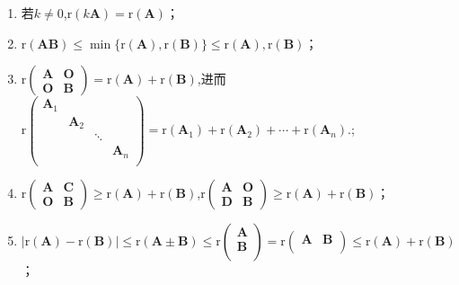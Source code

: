 \documentclass[../../main.tex]{subfiles}%
\begin{document}
\begin{proposition}[矩阵秩的基本公式]\label{proposition:矩阵秩的基本公式}
\begin{enumerate}[(1)]
\item \label{矩阵秩的基本公式1}若\(k\neq0\),\(\mathrm{r}(k\boldsymbol{A})=\mathrm{r}(\boldsymbol{A})\)；

\item \label{矩阵秩的基本公式2}\(\mathrm{r}(\boldsymbol{A}\boldsymbol{B})\leqslant \min\{\mathrm{r}(\boldsymbol{A}),\mathrm{r}(\boldsymbol{B})\}\leqslant \mathrm{r}(\boldsymbol{A}),\mathrm{r}(\boldsymbol{B})\)；

\item \label{矩阵秩的基本公式3}\(\mathrm{r}\begin{pmatrix}\boldsymbol{A}&\boldsymbol{O}\\\boldsymbol{O}&\boldsymbol{B}\end{pmatrix}=\mathrm{r}(\boldsymbol{A})+\mathrm{r}(\boldsymbol{B})\),进而$\mathrm{r}\left( \begin{matrix}
\boldsymbol{A}_1&		&		&		\\
&		\boldsymbol{A}_2&		&		\\
&		&		\ddots&		\\
&		&		&		\boldsymbol{A}_n\\
\end{matrix} \right) =\mathrm{r}\left( \boldsymbol{A}_1 \right) +\mathrm{r}\left( \boldsymbol{A}_2 \right) +\cdots +\mathrm{r}\left( \boldsymbol{A}_n \right) .$;

\item \label{矩阵秩的基本公式4}\(\mathrm{r}\begin{pmatrix}\boldsymbol{A}&\boldsymbol{C}\\\boldsymbol{O}&\boldsymbol{B}\end{pmatrix}\geqslant \mathrm{r}(\boldsymbol{A})+\mathrm{r}(\boldsymbol{B})\),\(\mathrm{r}\begin{pmatrix}\boldsymbol{A}&\boldsymbol{O}\\\boldsymbol{D}&\boldsymbol{B}\end{pmatrix}\geqslant \mathrm{r}(\boldsymbol{A})+\mathrm{r}(\boldsymbol{B})\)；

\item \label{矩阵秩的基本公式5}\(|\mathrm{r}(\boldsymbol{A})-\mathrm{r}(\boldsymbol{B})|\leqslant \mathrm{r}\left( \boldsymbol{A}\pm \boldsymbol{B} \right) \leqslant \mathrm{r}\left( \begin{array}{c}
\boldsymbol{A}\\
\boldsymbol{B}\\
\end{array} \right) =\mathrm{r}\left( \begin{matrix}
\boldsymbol{A}&		\boldsymbol{B}\\
\end{matrix} \right) \leqslant \mathrm{r}\left( \boldsymbol{A} \right) +\mathrm{r}\left( \boldsymbol{B} \right) \)；


\end{enumerate}
\end{proposition}
\end{document}
